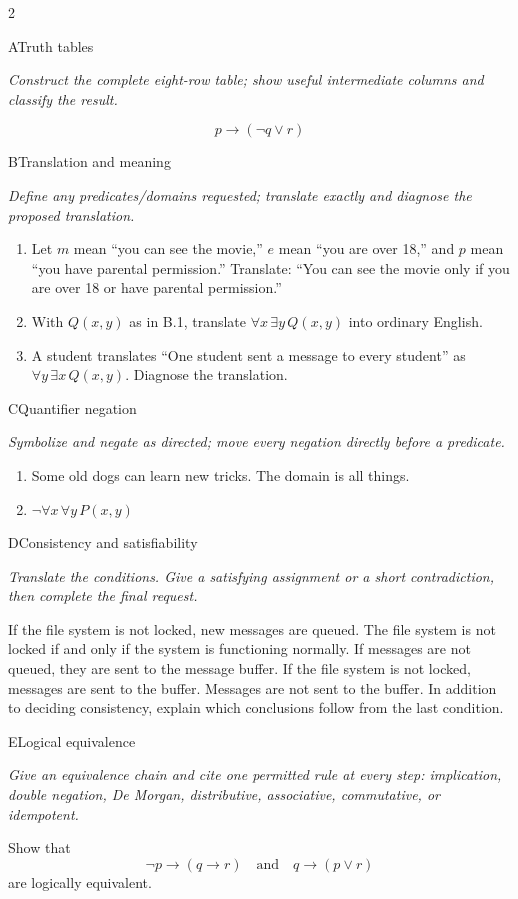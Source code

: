 \documentclass[9pt]{extarticle}
\begin{document}
\begin{multicols}{2}
\begin{CoreProblem}{A}{Truth tables}
{\scriptsize\textit{Construct the complete eight-row table; show useful intermediate columns and classify the result.}\par}
\[
  p\to(\neg q\lor r)
\]
\end{CoreProblem}
\begin{CoreProblem}{B}{Translation and meaning}
{\scriptsize\textit{Define any predicates/domains requested; translate exactly and diagnose the proposed translation.}\par}
\begin{enumerate}[label=(\alph*)]
  \item Let $m$ mean ``you can see the movie,'' $e$ mean ``you are over 18,''
        and $p$ mean ``you have parental permission.'' Translate: ``You can
        see the movie only if you are over 18 or have parental permission.''
  \item With $Q(x,y)$ as in B.1, translate $\forall x\,\exists y\,Q(x,y)$
        into ordinary English.
  \item A student translates ``One student sent a message to every student''
        as $\forall y\,\exists x\,Q(x,y)$. Diagnose the translation.
\end{enumerate}
\end{CoreProblem}
\begin{CoreProblem}{C}{Quantifier negation}
{\scriptsize\textit{Symbolize and negate as directed; move every negation directly before a predicate.}\par}
\begin{enumerate}[label=(\alph*)]
  \item Some old dogs can learn new tricks. The domain is all things.
  \item $\neg\forall x\,\forall y\,P(x,y)$
\end{enumerate}
\end{CoreProblem}
\columnbreak
\begin{CoreProblem}{D}{Consistency and satisfiability}
{\scriptsize\textit{Translate the conditions. Give a satisfying assignment or a short contradiction, then complete the final request.}\par}
If the file system is not locked, new messages are queued. The file system is
not locked if and only if the system is functioning normally. If messages are
not queued, they are sent to the message buffer. If the file system is not
locked, messages are sent to the buffer. Messages are not sent to the buffer.
In addition to deciding consistency, explain which conclusions follow from the
last condition.
\end{CoreProblem}
\begin{CoreProblem}{E}{Logical equivalence}
{\scriptsize\textit{Give an equivalence chain and cite one permitted rule at every step: implication, double negation, De Morgan, distributive, associative, commutative, or idempotent.}\par}
Show that
\[
  \neg p\to(q\to r)
  \quad\text{and}\quad
  q\to(p\lor r)
\]
are logically equivalent.
\end{CoreProblem}
\end{multicols}
\end{document}
